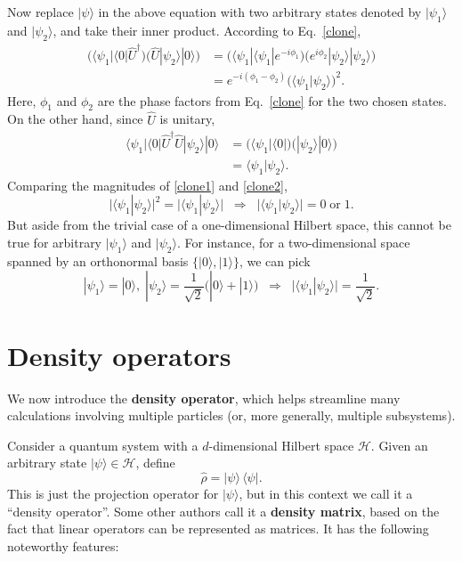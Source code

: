 \documentclass[pra,12pt]{revtex4-2}
\begin{document}
Now replace $|\psi\rangle$ in the above equation with two arbitrary
states denoted by $|\psi_1\rangle$ and $|\psi_2\rangle$, and take
their inner product.  According to Eq.~\eqref{clone},
\begin{align}
  \Big(\langle \psi_1 | \langle 0 | \hat{U}^\dagger \Big)
  \Big(\hat{U} | \psi_2 \rangle |0\rangle \Big)
  &=  \Big(\langle \psi_1| \langle \psi_1| e^{-i\phi_1} \Big) \Big( e^{i\phi_2} |\psi_2\rangle|\psi_2\rangle\Big) \\
  &= e^{-i(\phi_1-\phi_2)} \Big( \langle\psi_1 | \psi_2\rangle \Big)^2. \label{clone1}
\end{align}
Here, $\phi_1$ and $\phi_2$ are the phase factors from
Eq.~\eqref{clone} for the two chosen states.  On the other hand, since
$\hat{U}$ is unitary,
\begin{align}
  \langle \psi_1 | \langle 0 | \hat{U}^\dagger \hat{U} | \psi_2 \rangle |0\rangle
  &= \Big(\langle \psi_1 | \langle 0| \Big) \Big(| \psi_2 \rangle |0\rangle\Big)
  \\ &= \langle\psi_1 | \psi_2\rangle. \label{clone2}
\end{align}
Comparing the magnitudes of \eqref{clone1} and \eqref{clone2},
\begin{equation}
  \big|\langle \psi_1 | \psi_2\rangle \big|^2
  = \big| \langle\psi_1 | \psi_2\rangle \big|
  \;\;\Rightarrow \;\;
  \big|\langle\psi_1 | \psi_2\rangle\big| = 0 \;\mathrm{or}\; 1.
\end{equation}
But aside from the trivial case of a one-dimensional Hilbert space,
this cannot be true for arbitrary $|\psi_1\rangle$ and
$|\psi_2\rangle$.  For instance, for a two-dimensional space spanned
by an orthonormal basis $\{|0\rangle, |1\rangle\}$, we can pick
\begin{equation}
  |\psi_1\rangle = |0\rangle, \;
  |\psi_2\rangle = \frac{1}{\sqrt{2}}\big(|0\rangle +
  |1\rangle\big)
  \;\;\Rightarrow\;\;
  \big|\langle\psi_1|\psi_2\rangle\big| = \frac{1}{\sqrt{2}}.
\end{equation}

\section{Density operators}

We now introduce the \textbf{density operator}, which helps streamline
many calculations involving multiple particles (or, more generally,
multiple subsystems).

Consider a quantum system with a $d$-dimensional Hilbert space
$\mathscr{H}$.  Given an arbitrary state $|\psi\rangle \in
\mathscr{H}$, define
\begin{equation}
  \hat{\rho} = |\psi\rangle\, \langle\psi|.
  \label{rho_pure}
\end{equation}
This is just the projection operator for $|\psi\rangle$, but in this
context we call it a ``density operator''.  Some other authors call it
a \textbf{density matrix}, based on the fact that linear operators can
be represented as matrices.  It has the following noteworthy features:
\end{document}
